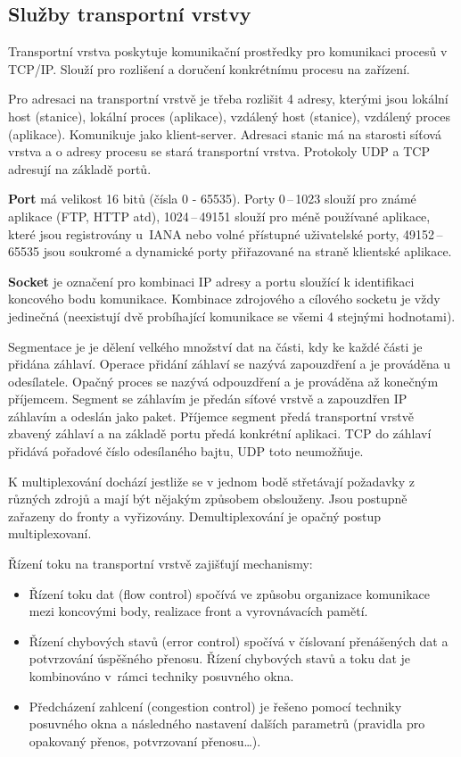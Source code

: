\subsection{Služby transportní vrstvy}

Transportní vrstva poskytuje komunikační prostředky pro komunikaci procesů v TCP/IP. Slouží pro rozlišení a doručení konkrétnímu procesu na zařízení.

Pro adresaci na transportní vrstvě je třeba rozlišit 4 adresy, kterými jsou lokální host (stanice), lokální proces (aplikace), vzdálený host (stanice), vzdálený proces (aplikace). Komunikuje jako klient-server. Adresaci stanic má na starosti síťová vrstva a o adresy procesu se stará transportní vrstva. Protokoly UDP a TCP adresují na základě portů.

\textbf{Port} má velikost 16 bitů (čísla 0 - 65535). Porty 0\,--\,1023 slouží pro známé aplikace (FTP, HTTP atd), 1024\,--\,49151 slouží pro méně používané aplikace, které jsou registrovány u~IANA nebo volné přístupné uživatelské porty, 49152\,--\,65535 jsou soukromé a dynamické porty přiřazované na straně klientské aplikace.

\textbf{Socket} je označení pro kombinaci IP adresy a portu sloužící k identifikaci koncového bodu komunikace. Kombinace zdrojového a cílového socketu je vždy jedinečná (neexistují dvě probíhající komunikace se všemi 4 stejnými hodnotami). 

Segmentace je je dělení velkého množství dat na části, kdy ke každé části je přidána záhlaví. Operace přidání záhlaví se nazývá zapouzdření a je prováděna u odesílatele. Opačný proces se nazývá odpouzdření a je prováděna až konečným příjemcem. Segment se záhlavím je předán síťové vrstvě a zapouzdřen IP záhlavím a odeslán jako paket. Příjemce segment předá transportní vrstvě zbavený záhlaví a na základě portu předá konkrétní aplikaci. TCP do záhlaví přidává pořadové číslo odesílaného bajtu, UDP toto neumožňuje. 

K multiplexování dochází jestliže se v jednom bodě střetávají požadavky z různých zdrojů a mají být nějakým způsobem obslouženy. Jsou postupně zařazeny do fronty a vyřizovány. Demultiplexování je opačný postup multiplexovaní. 

Řízení toku na transportní vrstvě zajišťují mechanismy:
\begin{itemize}[noitemsep]
    \item Řízení toku dat (flow control) spočívá ve způsobu organizace komunikace mezi koncovými body, realizace front a vyrovnávacích pamětí.
    \item Řízení chybových stavů (error control) spočívá v číslovaní  přenášených dat a potvrzování úspěšného přenosu. Řízení chybových stavů a toku dat je kombinováno v~rámci techniky posuvného okna.
    \item Předcházení zahlcení (congestion control) je řešeno pomocí techniky posuvného okna a následného nastavení dalších parametrů (pravidla pro opakovaný přenos, potvrzovaní přenosu\dots).
\end{itemize}

